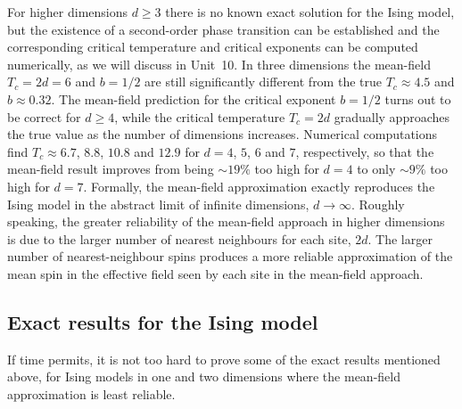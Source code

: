 For higher dimensions $d \geq 3$ there is no known exact solution for the Ising model, but the existence of a second-order phase transition can be established and the corresponding critical temperature and critical exponents can be computed numerically, as we will discuss in Unit~10.
In three dimensions the mean-field $T_c = 2d = 6$ and $b = 1 / 2$ are still significantly different from the true $T_c \approx 4.5$ and $b \approx 0.32$. %
The mean-field prediction for the critical exponent $b = 1 / 2$ turns out to be correct for $d \geq 4$, while the critical temperature $T_c = 2d$ gradually approaches the true value as the number of dimensions increases.
Numerical computations find $T_c \approx 6.7$, $8.8$, $10.8$ and $12.9$ for $d = 4$, $5$, $6$ and $7$, respectively, so that the mean-field result improves from being $\sim$$19\%$ too high for $d = 4$ to only $\sim$$9\%$ too high for $d = 7$. %
Formally, the mean-field approximation exactly reproduces the Ising model in the abstract limit of infinite dimensions, $d \to \infty$.
Roughly speaking, the greater reliability of the mean-field approach in higher dimensions is due to the larger number of nearest neighbours for each site, $2d$.
The larger number of nearest-neighbour spins produces a more reliable approximation of the mean spin in the effective field seen by each site in the mean-field approach.



\subsection{Exact results for the Ising model}
If time permits, it is not too hard to prove some of the exact results mentioned above, for Ising models in one and two dimensions where the mean-field approximation is least reliable.

